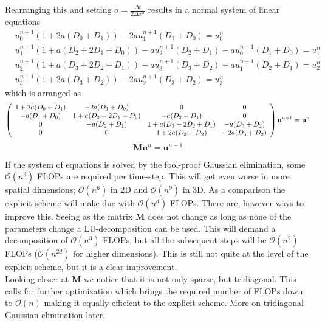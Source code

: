 Rearranging this and setting $a = \frac{\Delta t}{2\Delta x^2}$ results in a normal system of linear equations
\begin{align*}
 &u^{n+1}_0\left(1+2a(D_0+D_1)\right)- 2au^{n+1}_{1}(D_1+D_0) =  u^n_0\\
 &u^{n+1}_1\left(1+a(D_2+2D_1+D_0)\right)-au^{n+1}_{2}(D_2+D_1)-au^{n+1}_{0}(D_1+D_0) = u^n_1\\
 &u^{n+1}_2\left(1+a(D_3+2D_2+D_1)\right)-au^{n+1}_{3}(D_3+D_2)-au^{n+1}_{1}(D_2+D_1) = u^n_2\\
 &u^{n+1}_3\left(1+2a(D_3+D_2)\right)- 2au^{n+1}_{2}(D_3+D_2) =  u^n_3
\end{align*}
which is arranged as 
{\scriptsize
\begin{align}\label{BE}
 \left(\begin{array}{c c c c}
        1+2a(D_0+D_1) & -2a(D_1+D_0) &0 &0 \\
        -a(D_1+D_0) &1+a(D_2+2D_1+D_0) & -a(D_2+D_1) &0 \\
        0& -a(D_2+D_1) & 1+a(D_3+2D_2+D_1)& -a(D_3+D_2)\\
        0& 0& 1+2a(D_3+D_2) & - 2a(D_3+D_2)\\
       \end{array}\right)\mathbf{u}^{n+1} = \mathbf{u}^{n}
\end{align}
}
\begin{equation}
  \mathbf{M}\mathbf{u}^n = \mathbf{u}^{n-1}
\end{equation}


If the system of equations is solved by the fool-proof Gaussian elimination, some $\mathcal O(n^3)$ FLOPs are required per time-step. This will get even worse in more spatial dimensions; $\mathcal O(n^6)$ in 2D and $\mathcal O(n^9)$ in 3D. 
As a comparison the explicit scheme will make due with $\mathcal O(n^d)$ FLOPs.
There are, however ways to improve this. Seeing as the matrix $\mathbf M$ does not change as long as none of the parameters change a LU-decomposition can be used. 
This will demand a decomposition of $\mathcal{O}(n^3)$ FLOPs, but all the subsequent steps will be $\mathcal{O}(n^2)$ FLOPs ($\mathcal O(n^{2d})$ for higher dimensions). 
This is still not quite at the level of the explicit scheme, but it is a clear improvement. \\
Looking closer at $\mathbf M$ we notice that it is not only sparse, but tridiagonal. This calls for further optimization which brings the required number of FLOPs down to $\mathcal O(n)$ making it equally efficient to the explicit scheme. More on tridiagonal Gaussian elimination later.

